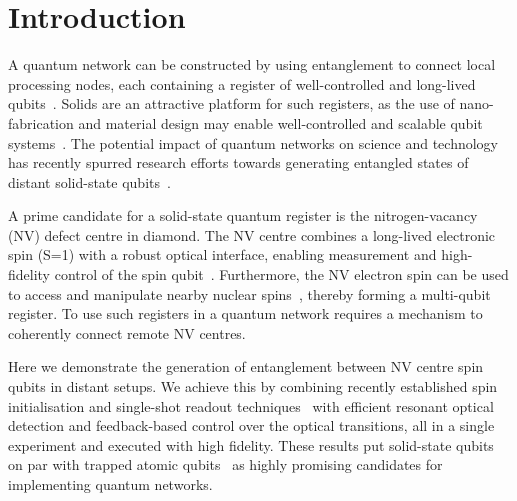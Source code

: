 
\clearpage

\section{Introduction}

A quantum network can be constructed by using entanglement to connect local processing nodes, each containing a register of well-controlled and long-lived qubits~\cite{Kimble_Nature_2008}. Solids are an attractive platform for such registers, as the use of nano-fabrication and material design may enable well-controlled and scalable qubit systems~\cite{Ladd_Nature_2010}. The potential impact of quantum networks on science and technology has recently spurred research efforts towards generating entangled states of distant solid-state qubits~\cite{Togan_Nature_2010,Gao_Nature_2012,DeGreve_Nature_2012,Bernien_Phys.Rev.Lett._2012,Sipahigil_Phys.Rev.Lett._2012,Patel_NatPhoton_2010,Flagg_Phys.Rev.Lett._2010}.

A prime candidate for a solid-state quantum register is the nitrogen-vacancy (NV) defect centre in diamond. The NV centre combines a long-lived electronic spin (S=1) with a robust optical interface, enabling measurement and high-fidelity control of the spin qubit~\cite{Togan_Nature_2010,Fuchs_Science_2009,Lange_Science_2010,vanderSar_Nature_2012}. Furthermore, the NV electron spin can be used to access and manipulate nearby nuclear spins~\cite{Robledo_Nature_2011,Neumann_Science_2010,Neumann_Science_2008,Maurer_Science_2012,Pfaff_NatPhys_2013}, thereby forming a multi-qubit register. To use such registers in a quantum network requires a mechanism to coherently connect remote NV centres.

Here we demonstrate the generation of entanglement between NV centre spin qubits in distant setups. We achieve this by combining recently established spin initialisation and single-shot readout techniques~\cite{Robledo_Nature_2011} with efficient resonant optical detection and feedback-based control over the optical transitions, all in a single experiment and executed with high fidelity. These results put solid-state qubits on par with trapped atomic qubits~\cite{Moehring_Nature_2007,Ritter_Nature_2012,Hofmann_Science_2012} as highly promising candidates for implementing quantum networks.

